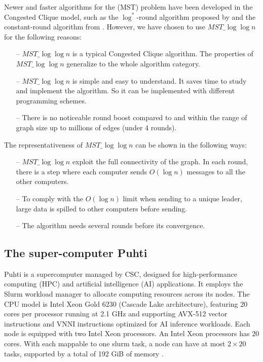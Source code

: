 \documentclass[english, 12pt, a4paper, elec, utf8, a-2b, online]{aaltothesis}
\newcommand{\mstalgo}{$MST\_\log\log{n}$}
\begin{document}
Newer and faster algorithms for the (MST) problem have been developed in the Congested Clique model, such as the $\log^*$-round algorithm proposed by \cite{MSTLogStar} and the constant-round algorithm from \cite{MSTConstant}. However, we have chosen to use \mstalgo{} for the following reasons:
\begin{itemize}
	\item[--] \mstalgo{} is a typical Congested Clique algorithm. The properties of \mstalgo{} generalize to the whole algorithm category.
	\item[--] \mstalgo{} is simple and easy to understand. It saves time to study and implement the algorithm. So it can be implemented with different programming schemes.
	\item[--] There is no noticeable round boost compared to \cite{MSTLogStar} and \cite{MSTConstant} within the range of graph size up to millions of edges (under 4 rounds).
\end{itemize}
The representativeness of \mstalgo{}{} can be shown in the following ways:
\begin{itemize}
	\item[--] \mstalgo{} exploit the full connectivity of the graph. In each round, there is a step where each computer sends $O(\log{n})$ messages to all the other computers.
	\item[--] To comply with the $O(\log{n})$ limit when sending to a unique leader, large data is spilled to other computers before sending.
	\item[--] The algorithm needs several rounds before its convergence.
\end{itemize}

\subsection{The super-computer Puhti}
Puhti is a supercomputer managed by CSC, designed for high-performance computing (HPC) and artificial intelligence (AI) applications. It employs the Slurm workload manager \cite{Slurm} to allocate computing resources across its nodes. The CPU model is Intel Xeon Gold 6230 (Cascade Lake architecture), featuring 20 cores per processor running at 2.1 GHz and supporting AVX-512 vector instructions and VNNI instructions optimized for AI inference workloads. Each node is equipped with two Intel Xeon processors. An Intel Xeon processors has $20$ cores. With each mappable to one slurm task, a node can have at most $2 \times 20$ tasks, supported by a total of 192 GiB of memory \cite{PuhtiDoc}.
\end{document}
